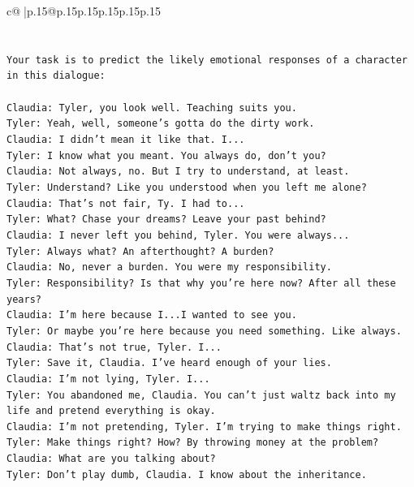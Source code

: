 \documentclass{article}
\begin{document}
{\begin{supertabular}{c@{$\;$}|p{.15\linewidth}@{}p{.15\linewidth}p{.15\linewidth}p{.15\linewidth}p{.15\linewidth}p{.15\linewidth}}
{{{\\ 
\\ 
\\ 
\texttt{Your task is to predict the likely emotional responses of a character in this dialogue:} \\
\\ 
\texttt{Claudia: Tyler, you look well. Teaching suits you.} \\
\texttt{Tyler: Yeah, well, someone's gotta do the dirty work.} \\
\texttt{Claudia: I didn't mean it like that. I...} \\
\texttt{Tyler: I know what you meant. You always do, don't you?} \\
\texttt{Claudia: Not always, no. But I try to understand, at least.} \\
\texttt{Tyler: Understand? Like you understood when you left me alone?} \\
\texttt{Claudia: That's not fair, Ty. I had to...} \\
\texttt{Tyler: What? Chase your dreams? Leave your past behind?} \\
\texttt{Claudia: I never left you behind, Tyler. You were always...} \\
\texttt{Tyler: Always what? An afterthought? A burden?} \\
\texttt{Claudia: No, never a burden. You were my responsibility.} \\
\texttt{Tyler: Responsibility? Is that why you're here now? After all these years?} \\
\texttt{Claudia: I'm here because I...I wanted to see you.} \\
\texttt{Tyler: Or maybe you're here because you need something. Like always.} \\
\texttt{Claudia: That's not true, Tyler. I...} \\
\texttt{Tyler: Save it, Claudia. I've heard enough of your lies.} \\
\texttt{Claudia: I'm not lying, Tyler. I...} \\
\texttt{Tyler: You abandoned me, Claudia. You can't just waltz back into my life and pretend everything is okay.} \\
\texttt{Claudia: I'm not pretending, Tyler. I'm trying to make things right.} \\
\texttt{Tyler: Make things right? How? By throwing money at the problem?} \\
\texttt{Claudia: What are you talking about?} \\
\texttt{Tyler: Don't play dumb, Claudia. I know about the inheritance.} \\
}}}
\end{supertabular}}
\end{document}

